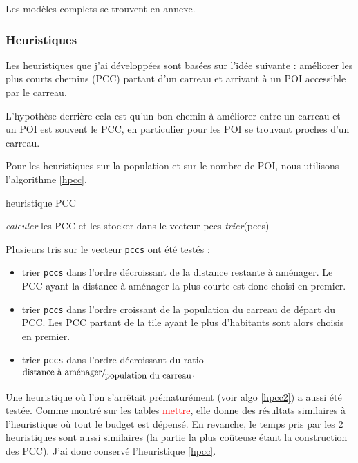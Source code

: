 Les modèles complets se trouvent en annexe.

\subsubsection{Heuristiques}\label{sect:heuristiquesopt}

Les heuristiques que j'ai développées sont basées sur l'idée suivante : améliorer les plus courts chemins (PCC) partant d'un carreau et arrivant à un POI accessible par le carreau.

L'hypothèse derrière cela est qu'un bon chemin à améliorer entre un carreau et un POI est souvent le PCC, en particulier pour les POI se trouvant proches d'un carreau.

Pour les heuristiques sur la population et sur le nombre de POI, nous utilisons l'algorithme \ref{hpcc}.  

\begin{algorithm}[H]
\DontPrintSemicolon
\caption{heuristique PCC}
\label{hpcc}
\emph{calculer} les PCC et les stocker dans le vecteur pccs\;
\emph{trier}(pccs) \;
\end{algorithm}

Plusieurs tris sur le vecteur \texttt{pccs} ont été testés : 
\begin{itemize}
    \item trier \texttt{pccs} dans l'ordre décroissant de la distance restante à aménager. Le PCC ayant la distance à aménager la plus courte est donc choisi en premier.
    \item trier \texttt{pccs} dans l'ordre croissant de la population du carreau de départ du PCC. Les PCC partant de la tile ayant le plus d'habitants sont alors choisis en premier.
    \item trier \texttt{pccs} dans l'ordre décroissant du ratio $\fFrac{\text{distance à aménager}}{\text{population du carreau}}$.
\end{itemize}


Une heuristique où l'on s'arrêtait prématurément (voir algo \ref{hpcc2}) a aussi été testée. Comme montré sur les tables \textcolor{red}{mettre}, elle donne des résultats similaires à l'heuristique où tout le budget est dépensé. En revanche, le temps pris par les 2 heuristiques sont aussi similaires (la partie la plus coûteuse étant la construction des PCC). J'ai donc conservé l'heuristique \ref{hpcc}.

